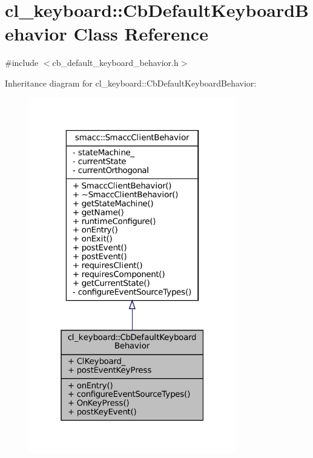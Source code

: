\hypertarget{classcl__keyboard_1_1CbDefaultKeyboardBehavior}{}\section{cl\+\_\+keyboard\+:\+:Cb\+Default\+Keyboard\+Behavior Class Reference}
\label{classcl__keyboard_1_1CbDefaultKeyboardBehavior}


{\ttfamily \#include $<$cb\+\_\+default\+\_\+keyboard\+\_\+behavior.\+h$>$}



Inheritance diagram for cl\+\_\+keyboard\+:\+:Cb\+Default\+Keyboard\+Behavior\+:
\nopagebreak
\begin{figure}[H]
\begin{center}
\leavevmode
\includegraphics[width=256pt]{classcl__keyboard_1_1CbDefaultKeyboardBehavior__inherit__graph}
\end{center}
\end{figure}


